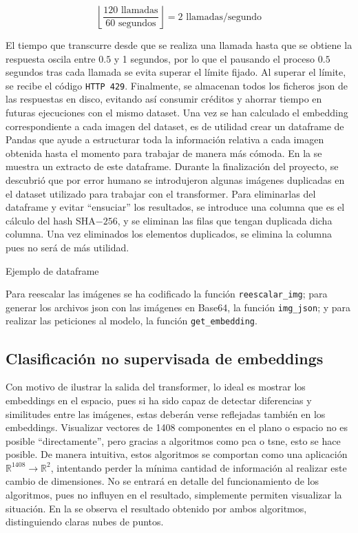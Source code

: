 				$$
				\left\lfloor\frac{120\text{ llamadas}}{60\text{ segundos}}\right\rfloor = 2 \text{ llamadas/segundo}
				$$
				
				El tiempo que transcurre desde que se realiza una llamada hasta que se obtiene la respuesta oscila entre $0.5$ y 1 segundos, por lo que el pausando el proceso $0.5$ segundos tras cada llamada se evita superar el límite fijado. Al superar el límite, se recibe el código \texttt{HTTP 429}. Finalmente, se almacenan todos los ficheros \gls{json} de las respuestas en disco, evitando así consumir  créditos y ahorrar tiempo en futuras ejecuciones con el mismo dataset. Una vez se han calculado el embedding correspondiente a cada imagen del dataset, es de utilidad crear un dataframe de Pandas que ayude a estructurar toda la información relativa a cada imagen obtenida hasta el momento para trabajar de manera más cómoda. En la  se muestra un extracto de este dataframe. Durante la finalización del proyecto, se descubrió que por error humano se introdujeron algunas imágenes duplicadas en el dataset utilizado para trabajar con el transformer. Para eliminarlas del dataframe y evitar ``ensuciar'' los resultados, se introduce una columna que es el cálculo del hash SHA$-256$, y se eliminan las filas que tengan duplicada dicha columna. Una vez eliminados los elementos duplicados, se elimina la columna pues no será de más utilidad. 
				
				\begin{table}[!h]
					\scriptsize
					\centering
					\texttt{}
					\caption{Ejemplo de dataframe}
					\label{tab:df_ejemplo}
				\end{table}
				
				Para reescalar las imágenes se ha codificado la función \texttt{reescalar\_img}; para generar los archivos \gls{json} con las imágenes en Base64, la función \texttt{img\_json}; y para realizar las peticiones al modelo, la función \texttt{get\_embedding}. 
				
			\subsection{Clasificación no supervisada de embeddings}
				
				Con motivo de ilustrar la salida del transformer, lo ideal es mostrar los embeddings en el espacio, pues si ha sido capaz de detectar diferencias y similitudes entre las imágenes, estas deberán verse reflejadas también en los embeddings. Visualizar vectores de 1408 componentes en el plano o espacio no es posible ``directamente'', pero gracias a algoritmos como \gls{pca} o \gls{tsne}, esto se hace posible. De manera intuitiva, estos algoritmos se comportan como una aplicación $\mathbb{R}^{1408} \longrightarrow \mathbb{R}^2$, intentando perder la mínima cantidad de información al realizar este cambio de dimensiones. No se entrará en detalle del funcionamiento de los algoritmos, pues no influyen en el resultado, simplemente permiten visualizar la situación. En la  se observa el resultado obtenido por ambos algoritmos, distinguiendo claras nubes de puntos. 
				
